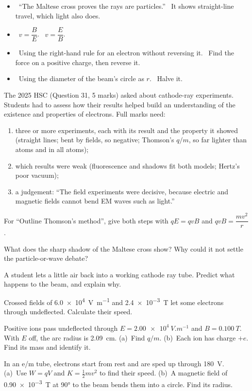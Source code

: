 \begin{mistakes}
\begin{itemize}
  \item \xmark\ ``The Maltese cross proves the rays are particles.'' \cmark\ It
        shows straight-line travel, which light also does.
  \item \xmark\ $v = \dfrac{B}{E}$. \cmark\ $v = \dfrac{E}{B}$.
  \item \xmark\ Using the right-hand rule for an electron without reversing it.
        \cmark\ Find the force on a positive charge, then reverse it.
  \item \xmark\ Using the diameter of the beam's circle as $r$. \cmark\ Halve it.
\end{itemize}
\end{mistakes}

\begin{examtip}
The 2025 HSC (Question 31, 5 marks) asked about cathode-ray experiments.
Students had to assess how their results helped build an understanding of the
existence and properties of electrons. Full marks need:
\begin{enumerate}
  \item three or more experiments, each with its result and the property it showed
        (straight lines; bent by fields, so negative; Thomson's $q/m$, so far
        lighter than atoms and in all atoms);
  \item which results were weak (fluorescence and shadows fit both models;
        Hertz's poor vacuum);
  \item a judgement: ``The field experiments were decisive, because electric and
        magnetic fields cannot bend EM waves such as light.''
\end{enumerate}
For ``Outline Thomson's method'', give both steps with $qE = qvB$ and
$qvB = \dfrac{mv^2}{r}$.
\end{examtip}

\begin{quickcheck}
  \item What does the sharp shadow of the Maltese cross show? Why could it not
        settle the particle-or-wave debate?
  \item A student lets a little air back into a working cathode ray tube.
        Predict what happens to the beam, and explain why.
  \item Crossed fields of \qty{6.0e4}{V.m^{-1}} and \qty{2.4e-3}{T} let some
        electrons through undeflected. Calculate their speed.
  \item Positive ions pass undeflected through $E = \qty{2.00e4}{V.m^{-1}}$ and
        $B = \qty{0.100}{T}$. With $E$ off, the arc radius is \qty{2.09}{cm}.
        (a)~Find $q/m$. (b)~Each ion has charge $+e$. Find its mass and identify it.
  \item In an e/m tube, electrons start from rest and are sped up through
        \qty{180}{V}. (a)~Use $W = qV$ and $K = \tfrac12 mv^2$ to find their speed.
        (b)~A magnetic field of \qty{0.90e-3}{T} at \ang{90} to the beam bends
        them into a circle. Find its radius.
\end{quickcheck}

